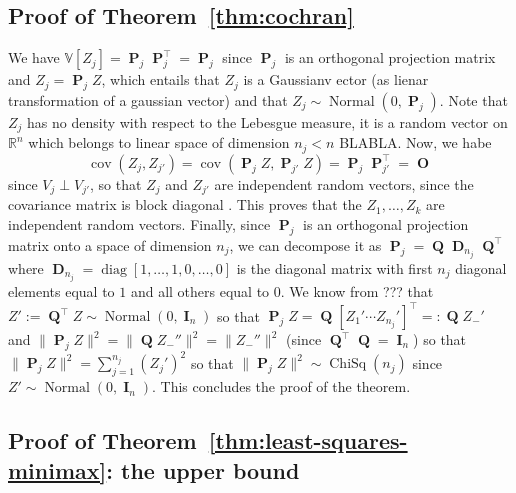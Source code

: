 \documentclass[
	fontsize=11pt, %
	twoside=false, %
	numbers=noenddot, %
]{kaobook}
\DeclareMathOperator{\bD}{{\boldsymbol D}}
\DeclareMathOperator{\bI}{{\boldsymbol I}}
\DeclareMathOperator{\bO}{{\boldsymbol O}}
\DeclareMathOperator{\bP}{{\boldsymbol P}}
\DeclareMathOperator{\bQ}{{\boldsymbol Q}}
\DeclareMathOperator{\diag}{diag}
\DeclareMathOperator{\chisq}{ChiSq}
\DeclareMathOperator{\nor}{Normal}
\DeclareMathOperator{\cov}{cov}
\newcommand{\R}{\mathbb R}
\newcommand{\var}{\mathbb V}
\newcommand{\norm}[1]{\| #1 \|}
\begin{document}
\subsection{Proof of Theorem~\ref{thm:cochran}} %


We have $\var[Z_j] = \bP_j \bP_j^\top = \bP_j$ since $\bP_j$ is an orthogonal projection matrix and $Z_j = \bP_j Z$, which entails that $Z_j$ is a Gaussianv ector (as lienar transformation of a gaussian vector) and that $Z_j \sim \nor(0, \bP_j)$. Note that $Z_j$ has no density with respect to the Lebesgue measure, it is a random vector on $\R^n$ which belongs to linear space of dimension $n_j < n$ BLABLA. Now, we habe
\begin{equation*}
	\cov(Z_j, Z_{j'}) = \cov(\bP_j Z, \bP_{j'} Z) = \bP_j \bP_{j'}^\top = \bO
\end{equation*}
since $V_j \perp V_{j'}$, so that $Z_j$ and $Z_{j'}$ are independent random vectors, since the covariance matrix is block diagonal .
This proves that the $Z_1, \ldots, Z_k$ are independent random vectors.
Finally, since $\bP_j$ is an orthogonal projection matrix onto a space of dimension $n_j$, we can decompose  it as $\bP_j = \bQ \bD_{n_j} \bQ^\top$ where $\bD_{n_j} = \diag[1, \ldots, 1, 0, \ldots, 0]$ is the diagonal matrix with first $n_j$ diagonal elements equal to $1$ and all others equal to $0$.
We know from ??? that $Z' := \bQ^\top Z \sim \nor(0, \bI_n)$ so that $\bP_j Z = \bQ [Z_1' \cdots Z_{n_j}']^\top =: \bQ Z_-'$ and $\norm{\bP_j Z}^2 = \norm{\bQ Z_-''}^2 = \norm{Z_-''}^2$ (since $\bQ^\top \bQ = \bI_n$) so that $\norm{\bP_j Z}^2 = \sum_{j=1}^{n_j} (Z_j')^2$ so that $\norm{\bP_j Z}^2 \sim \chisq(n_j)$ since $Z' \sim \nor(0, \bI_n)$. This concludes the proof of the theorem.


\subsection{Proof of Theorem~\ref{thm:least-squares-minimax}:  the upper bound} %
\end{document}
